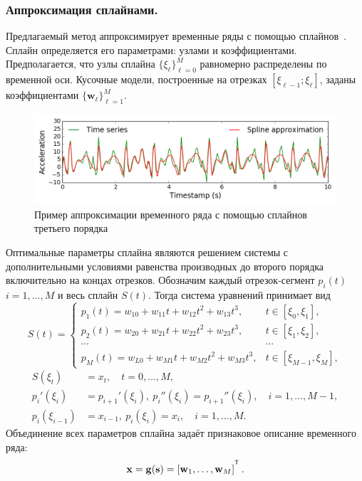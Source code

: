 \subsubsection{Аппроксимация сплайнами.}
Предлагаемый метод аппроксимирует временные ряды с помощью сплайнов~\cite{deboor1978splines}. Сплайн определяется его параметрами: узлами и коэффициентами.
Предполагается, что узлы сплайна $\{\xi_\ell\}_{\ell=0}^M$ равномерно распределены по временной оси.
Кусочные модели, построенные на отрезках $[\xi_{\ell-1}; \xi_{\ell}]$, заданы коэффициентами $\{\mathbf{w}_\ell\}_{\ell=1}^{M}$.
\begin{figure}[h]
	\centering
	\includegraphics[width=1\linewidth]{figs/ch6/spline_example.png}
	\caption{Пример аппроксимации временного ряда с помощью сплайнов третьего порядка}
	\label{ch6:fig:spline_example}
\end{figure}
Оптимальные параметры сплайна являются решением системы с дополнительными условиями равенства производных до второго порядка включительно на концах отрезков.
Обозначим каждый отрезок-сегмент $p_i(t)$ $i = 1, \dots, M$ и весь сплайн $S(t)$. Тогда система уравнений принимает вид
\begin{equation*}
	S(t) = \begin{cases}
		p_1(t) = w_{10} +w_{11}t + w_{12}t^2 + w_{13}t^3, & t\in [\xi_0, \xi_1],\\
		p_2(t) = w_{20} +w_{21}t + w_{22}t^2 + w_{23}t^3, & t\in [\xi_1, \xi_2],\\
		\cdots&\cdots \\
		p_{M}(t) = w_{L0} +w_{M1}t + w_{M2}t^2 + w_{M3}t^3, & t\in [\xi_{M-1}, \xi_M],					
	\end{cases}
\end{equation*}
\begin{align*}
	S(\xi_t) &= x_t, \quad t = 0, \dots, M,\\
	p_i'(\xi_i) &= p_{i+1}'(\xi_i),\: p_i''(\xi_i) = p_{i+1}''(\xi_i), \quad i = 1, \dots, M-1,\\
	p_i(\xi_{i-1}) &= x_{i-1},\: p_i(\xi_i) = x_i, \quad i = 1, \dots, M.
\end{align*}
Объединение всех параметров сплайна задаёт признаковое описание временного ряда:
\[
	\bx = \mathbf{g}(\bs) = \left[\mathbf{w}_1, \dots, \mathbf{w}_{M}\right]^{\T}.
\]

